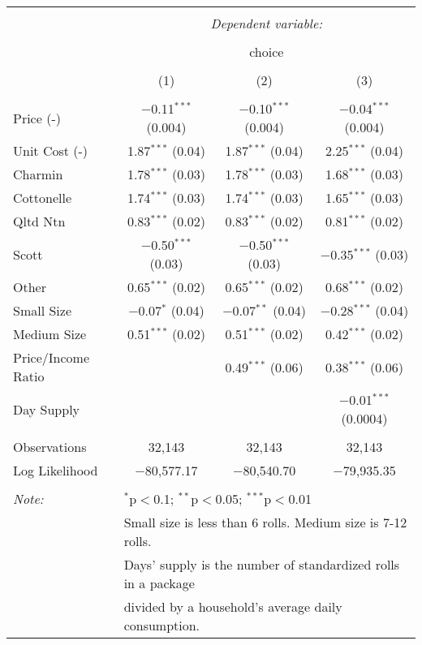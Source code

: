 
\begin{table}[!htbp] \centering 
  \caption{} 
  \label{tab:mnlLABaseline} 
\begin{tabular}{@{\extracolsep{5pt}}lccc} 
\\[-1.8ex]\hline 
\hline \\[-1.8ex] 
 & \multicolumn{3}{c}{\textit{Dependent variable:}} \\ 
\cline{2-4} 
\\[-1.8ex] & \multicolumn{3}{c}{choice} \\ 
\\[-1.8ex] & (1) & (2) & (3)\\ 
\hline \\[-1.8ex] 
 Price (-) & $-$0.11$^{***}$ (0.004) & $-$0.10$^{***}$ (0.004) & $-$0.04$^{***}$ (0.004) \\ 
  Unit Cost (-) & 1.87$^{***}$ (0.04) & 1.87$^{***}$ (0.04) & 2.25$^{***}$ (0.04) \\ 
  Charmin & 1.78$^{***}$ (0.03) & 1.78$^{***}$ (0.03) & 1.68$^{***}$ (0.03) \\ 
  Cottonelle & 1.74$^{***}$ (0.03) & 1.74$^{***}$ (0.03) & 1.65$^{***}$ (0.03) \\ 
  Qltd Ntn & 0.83$^{***}$ (0.02) & 0.83$^{***}$ (0.02) & 0.81$^{***}$ (0.02) \\ 
  Scott & $-$0.50$^{***}$ (0.03) & $-$0.50$^{***}$ (0.03) & $-$0.35$^{***}$ (0.03) \\ 
  Other & 0.65$^{***}$ (0.02) & 0.65$^{***}$ (0.02) & 0.68$^{***}$ (0.02) \\ 
  Small Size & $-$0.07$^{*}$ (0.04) & $-$0.07$^{**}$ (0.04) & $-$0.28$^{***}$ (0.04) \\ 
  Medium Size & 0.51$^{***}$ (0.02) & 0.51$^{***}$ (0.02) & 0.42$^{***}$ (0.02) \\ 
  Price/Income Ratio &  & 0.49$^{***}$ (0.06) & 0.38$^{***}$ (0.06) \\ 
  Day Supply &  &  & $-$0.01$^{***}$ (0.0004) \\ 
 \hline \\[-1.8ex] 
Observations & 32,143 & 32,143 & 32,143 \\ 
Log Likelihood & $-$80,577.17 & $-$80,540.70 & $-$79,935.35 \\ 
\hline 
\hline \\[-1.8ex] 
\textit{Note:}  & \multicolumn{3}{l}{$^{*}$p$<$0.1; $^{**}$p$<$0.05; $^{***}$p$<$0.01} \\ 
 & \multicolumn{3}{l}{Small size is less than 6 rolls. Medium size is 7-12 rolls. } \\ 
 & \multicolumn{3}{l}{Days' supply is the number of standardized rolls in a package} \\ 
 & \multicolumn{3}{l}{divided by a household's average daily consumption.} \\ 
\end{tabular} 
\end{table} 
